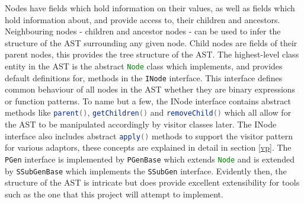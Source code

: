 Nodes have fields which hold information on their values, as well as fields which hold information about, and provide access to, their children and ancestors. Neighbouring nodes - children and ancestor nodes - can be used to infer the structure of the AST surrounding any given node. Child nodes are fields of their parent nodes, this provides the tree structure of the AST. The highest-level class entity in the AST is the abstract \lstinline[language=Java]{Node} class which implements, and provides default definitions for, methods in the \lstinline[language=Java]{INode} interface. This interface defines common behaviour of all nodes in the AST whether they are binary expressions or function patterns. To name but a few, the INode interface contains abstract methods like \lstinline[language=Java]{parent()}, \lstinline[language=Java]{getChildren()} and \lstinline[language=Java]{removeChild()} which all allow for the AST to be manipulated accordingly by visitor classes later. The INode interface also includes abstract \lstinline[language=Java]{apply()} methods to support the visitor pattern for various adaptors, these concepts are explained in detail in section \ref{vp}. The \lstinline[language=Java]{PGen} interface is implemented by \lstinline[language=Java]{PGenBase} which extends \lstinline[language=Java]{Node} and is extended by \lstinline[language=Java]{SSubGenBase} which implements the \lstinline[language=Java]{SSubGen} interface. Evidently then, the structure of the AST is intricate but does provide excellent extensibility for tools such as the one that this project will attempt to implement.

